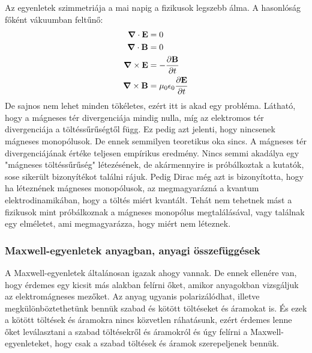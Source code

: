 \documentclass[a4paper,12pt]{article}
\begin{document}
Az egyenletek szimmetriája a mai napig a fizikusok legszebb álma. A hasonlóság főként vákuumban feltűnő:
\begin{equation}
    \begin{aligned}
        \boldsymbol{\nabla} \cdot \bold{E} &= 0 \\
        \boldsymbol{\nabla} \cdot \bold{B} &= 0 \\
        \boldsymbol{\nabla} \times \bold{E} &= - \frac{\partial \bold{B}}{\partial t} \\
        \boldsymbol{\nabla} \times \bold{B} &= \mu_0 \epsilon_0 \frac{\partial \bold{E}}{\partial t}
    \end{aligned}
\end{equation}
De sajnos nem lehet minden tökéletes, ezért itt is akad egy probléma.
Látható, hogy a mágneses tér divergenciája mindig nulla, míg az elektromos tér divergenciája a töltéssűrűségtől függ. Ez pedig azt jelenti, hogy nincsenek mágneses monopólusok. De ennek semmilyen teoretikus oka sincs.
A mágneses tér divergenciájának értéke teljesen empírikus eredmény. Nincs semmi akadálya egy "mágneses töltéssűrűség" létezésének, de akármennyire is próbálkoztak a kutatók, sose sikerült bizonyítékot találni rájuk.
Pedig Dirac még azt is bizonyította, hogy ha léteznének mágneses monopólusok, az megmagyarázná a kvantum elektrodinamikában, hogy a töltés miért kvantált. Tehát nem tehetnek mást a fizikusok mint próbálkoznak a mágneses monopólus megtalálásával,
vagy találnak egy elméletet, ami megmagyarázza, hogy miért nem léteznek.

\subsubsection{Maxwell-egyenletek anyagban, anyagi összefüggések}
A Maxwell-egyenletek általánosan igazak ahogy vannak. De ennek ellenére van, hogy érdemes egy kicsit más alakban felírni őket, amikor anyagokban vizsgáljuk az elektromágneses mezőket.
Az anyag ugyanis polarizálódhat, illetve megkülönböztethetünk bennük szabad és kötött töltéseket és áramokat is. És ezek a kötött töltések és áramokra nincs közvetlen ráhatásunk,
ezért érdemes lenne őket leválasztani a szabad töltésekről és áramokról és úgy felírni a Maxwell-egyenleteket, hogy csak a szabad töltések és áramok szerepeljenek bennük.
\end{document}
